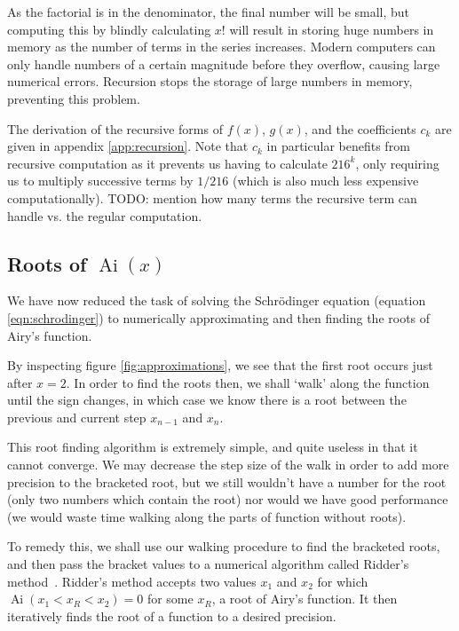 \documentclass[]{article}
\newcommand{\Ai}[1]{\ensuremath{\operatorname{Ai}({#1})}}
\begin{document}

As the factorial is in the denominator, the final number will be small, but computing this by blindly calculating $x!$ will result in storing huge numbers in memory as the number of terms in the series increases. Modern computers can only handle numbers of a certain magnitude before they overflow, causing large numerical errors. Recursion stops the storage of large numbers in memory, preventing this problem.

The derivation of the recursive forms of $f(x)$, $g(x)$, and the coefficients $c_{k}$ are given in appendix \ref{app:recursion}. Note that $c_{k}$ in particular benefits from recursive computation as it prevents us having to calculate $216^{k}$, only requiring us to multiply successive terms by $1/216$ (which is also much less expensive computationally). TODO: mention how many terms the recursive term can handle vs. the regular computation.

\subsection{Roots of \Ai{x}}

We have now reduced the task of solving the Schr\"{o}dinger equation (equation \ref{eqn:schrodinger}) to numerically approximating and then finding the roots of Airy's function.

By inspecting figure \ref{fig:approximations}, we see that the first root occurs just after $x = 2$. In order to find the roots then, we shall `walk' along the function until the sign changes, in which case we know there is a root between the previous and current step $x_{n-1}$ and $x_{n}$.

This root finding algorithm is extremely simple, and quite useless in that it cannot converge. We may decrease the step size of the walk in order to add more precision to the bracketed root, but we still wouldn't have a number for the root (only two numbers which contain the root) nor would we have good performance (we would waste time walking along the parts of function without roots).

To remedy this, we shall use our walking procedure to find the bracketed roots, and then pass the bracket values to a numerical algorithm called Ridder's method~\cite{ref:nr}. Ridder's method accepts two values $x_{1}$ and $x_{2}$ for which $\Ai{x_{1} < x_{R} < x_{2}} = 0$ for some $x_{R}$, a root of Airy's function. It then iteratively finds the root of a function to a desired precision.
\end{document}
